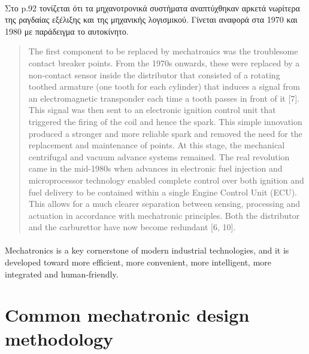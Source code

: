 \documentclass[a4paper,12pt,twoside]{report}
\begin{document}
{			\paragraph{} {Στο \cite{MechatronicsΑndΤheMotorCar:Seward2011} p.92 τονίζεται ότι τα μηχανοτρονικά συστήματα αναπτύχθηκαν αρκετά νωρίτερα της ραγδαίας εξέλιξης και της μηχανικής λογισμικού. Γίνεται αναφορά στα 1970 και 1980 με παράδειγμα το αυτοκίνητο.
			\begin{quote}
			The first component to be replaced by mechatronics was the troublesome contact breaker points. From the 1970s onwards, these were replaced by a non-contact sensor inside the distributor that consisted of a rotating toothed armature (one tooth for each cylinder) that induces a signal from an electromagnetic transponder each time a tooth passes in front of it [7]. This signal was then sent to an electronic ignition control unit that triggered the firing of the coil and hence the spark. This simple innovation produced a stronger and more reliable spark and removed the need for the replacement and maintenance of points. At this stage, the mechanical centrifugal and vacuum advance systems remained.
			\linebreak The real revolution came in the mid-1980s when advances in electronic fuel injection and microprocessor technology enabled complete control over both ignition and fuel delivery to be contained within a single Engine Control Unit (ECU). This allows for a much clearer separation between sensing, processing and actuation in accordance with mechatronic principles. Both the distributor and the carburettor have now become redundant [6, 10].
			\end{quote}
			}
			
			\paragraph{} {Mechatronics is a key cornerstone of modern industrial technologies, and it is developed toward more efficient, more convenient, more intelligent, more integrated and human-friendly. \cite{AReviewOfMechatronicsAndBioInspiredMechatronicsSystem:Luoa2008}			
			}
			
			\section{Common mechatronic design methodology}
}
\end{document}
